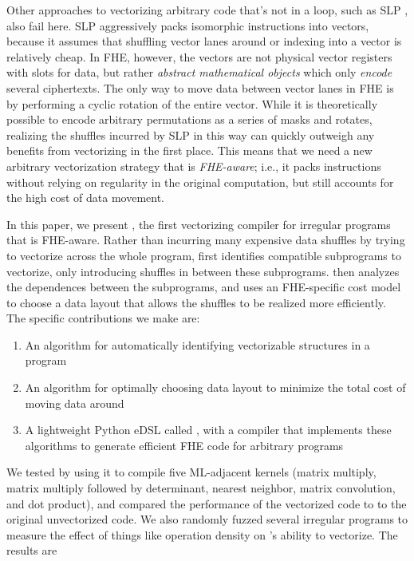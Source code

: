 Other approaches to vectorizing arbitrary code that's not in a loop, such as SLP \cite{SLP}, also fail here.
SLP aggressively packs isomorphic instructions into vectors, because it assumes that shuffling vector lanes around or indexing into a vector is relatively cheap.
In FHE, however, the vectors are not physical vector registers with slots for data, but rather {\em abstract mathematical objects} which only {\em encode} several ciphertexts.
The only way to move data between vector lanes in FHE is by performing a cyclic rotation of the entire vector.
While it is theoretically possible to encode arbitrary permutations as a series of masks and rotates, realizing the shuffles incurred by SLP in this way can quickly outweigh any benefits from vectorizing in the first place.
This means that we need a new arbitrary vectorization strategy that is {\em FHE-aware}; i.e., it packs instructions without relying on regularity in the original computation, but still accounts for the high cost of data movement.

In this paper, we present \system, the first vectorizing compiler for irregular programs that is FHE-aware.
Rather than incurring many expensive data shuffles by trying to vectorize across the whole program, \system first identifies compatible subprograms to vectorize, only introducing shuffles in between these subprograms.
\system then analyzes the dependences between the subprograms, and uses an FHE-specific cost model to choose a data layout that allows the shuffles to be realized more efficiently.
The specific contributions we make are:
\begin{enumerate}
    \item An algorithm for automatically identifying vectorizable structures in a program
    \item An algorithm for optimally choosing data layout to minimize the total cost of moving data around
    \item A lightweight Python eDSL called \system, with a compiler that implements these algorithms to generate efficient FHE code for arbitrary programs 
\end{enumerate}

We tested \system by using it to compile five ML-adjacent kernels (matrix multiply, matrix multiply followed by determinant, nearest neighbor, matrix convolution, and dot product), and compared the performance of the vectorized code to to the original unvectorized code.
We also randomly fuzzed several irregular programs to measure the effect of things like operation density on \system's ability to vectorize. 
The results are 
